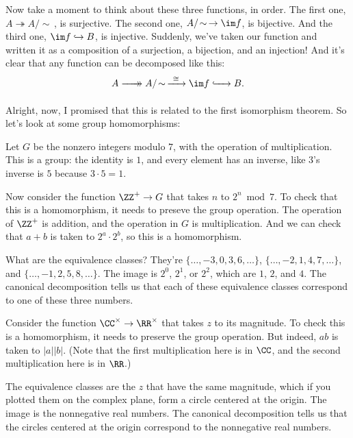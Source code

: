 \documentclass[11pt,paper=letter]{scrartcl}
\newcommand{\xrightarrowdbl}[2][]{%
  \xrightarrow[#1]{#2}\mathrel{\mkern-14mu}\rightarrow
}
\newcommand{\simm}{\!\sim\,}
\begin{document}
Now take a moment to think about these three functions, in order. The first one, $A \twoheadrightarrow A/\simm$, is surjective. The second one, $A/\simm \to \im f$, is bijective. And the third one, $\im f \hookrightarrow B$, is injective. Suddenly, we've taken our function and written it as a composition of a surjection, a bijection, and an injection! And it's clear that any function can be decomposed like this:
\[
A \xrightarrowdbl{\phantom{xxx}} A/\simm
\xrightarrow[\phantom{xxx}]{\cong} \im f
\xhookrightarrow{\phantom{xxx}} B.
\]

Alright, now, I promised that this is related to the first isomorphism theorem. So let's look at some group homomorphisms:

\begin{example*}
Let $G$ be the nonzero integers modulo $7$, with the operation of multiplication. This is a group: the identity is $1$, and every element has an inverse, like $3$'s inverse is $5$ because $3 \cdot 5 = 1$.

Now consider the function $\ZZ^+ \to G$ that takes $n$ to $2^n \bmod 7$. To check that this is a homomorphism, it needs to preseve the group operation. The operation of $\ZZ^+$ is addition, and the operation in $G$ is multiplication. And we can check that $a + b$ is taken to $2^a \cdot 2^b$, so this is a homomorphism.

What are the equivalence classes? They're $\{\ldots, -3, 0, 3, 6, \ldots\}$, $\{\ldots, -2, 1, 4, 7, \ldots\}$, and $\{\ldots, -1, 2, 5, 8, \ldots\}$. The image is $2^0$, $2^1$, or $2^2$, which are $1$, $2$, and $4$. The canonical decomposition tells us that each of these equivalence classes correspond to one of these three numbers.
\end{example*}

\begin{example*}
Consider the function $\CC^{\times} \to \RR^{\times}$ that takes $z$ to its magnitude. To check this is a homomorphism, it needs to preserve the group operation. But indeed, $ab$ is taken to $|a||b|$. (Note that the first multiplication here is in $\CC$, and the second multiplication here is in $\RR$.)

The equivalence classes are the $z$ that have the same magnitude, which if you plotted them on the complex plane, form a circle centered at the origin. The image is the nonnegative real numbers. The canonical decomposition tells us that the circles centered at the origin correspond to the nonnegative real numbers.
\end{example*}
\end{document}
